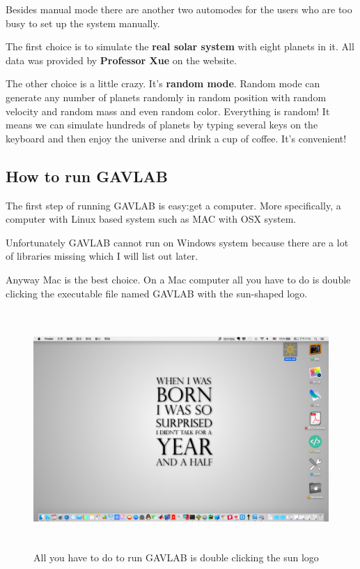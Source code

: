 \documentclass[12pt]{article}
\begin{document}
Besides manual mode there are another two automodes for the users who are too busy to set up the system manually.

The first choice is to simulate the \textbf{real solar system} with eight planets in it.
All data was provided by \textbf{Professor Xue} on the website.

The other choice is a little crazy.
It's \textbf{random mode}.
Random mode can generate any number of planets randomly in random position with random velocity and random mass and even random color.
Everything is random!
It means we can simulate hundreds of planets 
by typing several keys on the keyboard and then enjoy the universe and drink a cup of coffee.
It's convenient!
\clearpage


\subsection{How to run GAVLAB}
The first step of running GAVLAB is easy:get a computer.
More specifically, a computer with Linux based system such as MAC with OSX system.

Unfortunately GAVLAB cannot run on Windows system because there are a lot of libraries missing which I will
list out later.

Anyway Mac is the best choice.
On a Mac computer all you have to do is double clicking the executable file named GAVLAB with the sun-shaped logo.

\begin{figure}[H]
\centering
\includegraphics[width=14.4cm,height=9cm]{GAVLAB.png}
\caption{All you have to do to run GAVLAB is double clicking the sun logo}
\end{figure}
\end{document}
